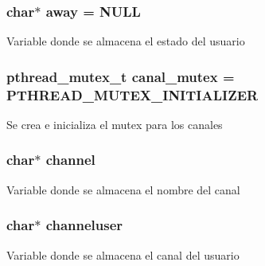 \subsubsection[{\texorpdfstring{away}{away}}]{\setlength{\rightskip}{0pt plus 5cm}char$\ast$ away = N\+U\+LL}\hypertarget{_g-2361-06-_p1-_server_8c_adf86742e21384f58f8999d8317e6a370}{}\label{_g-2361-06-_p1-_server_8c_adf86742e21384f58f8999d8317e6a370}
Variable donde se almacena el estado del usuario 
\subsubsection[{\texorpdfstring{canal\+\_\+mutex}{canal_mutex}}]{\setlength{\rightskip}{0pt plus 5cm}pthread\+\_\+mutex\+\_\+t canal\+\_\+mutex = P\+T\+H\+R\+E\+A\+D\+\_\+\+M\+U\+T\+E\+X\+\_\+\+I\+N\+I\+T\+I\+A\+L\+I\+Z\+ER}\hypertarget{_g-2361-06-_p1-_server_8c_ab86a544a49de18195048bac54dd3ac3e}{}\label{_g-2361-06-_p1-_server_8c_ab86a544a49de18195048bac54dd3ac3e}
Se crea e inicializa el mutex para los canales 
\subsubsection[{\texorpdfstring{channel}{channel}}]{\setlength{\rightskip}{0pt plus 5cm}char$\ast$ channel}\hypertarget{_g-2361-06-_p1-_server_8c_a842ca2f026578e5c479c095ff3335969}{}\label{_g-2361-06-_p1-_server_8c_a842ca2f026578e5c479c095ff3335969}
Variable donde se almacena el nombre del canal 
\subsubsection[{\texorpdfstring{channeluser}{channeluser}}]{\setlength{\rightskip}{0pt plus 5cm}char$\ast$ channeluser}\hypertarget{_g-2361-06-_p1-_server_8c_a55a7bd8f3229706c5917445aba995c5b}{}\label{_g-2361-06-_p1-_server_8c_a55a7bd8f3229706c5917445aba995c5b}
Variable donde se almacena el canal del usuario 
